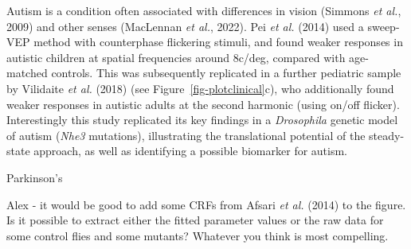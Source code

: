 \documentclass[
  letterpaper,
  DIV=11,
  numbers=noendperiod]{scrartcl}
\begin{document}
Autism is a condition often associated with differences in vision
(Simmons \emph{et al.}, 2009) and other senses (MacLennan \emph{et al.},
2022). Pei \emph{et al.} (2014) used a sweep-VEP method with
counterphase flickering stimuli, and found weaker responses in autistic
children at spatial frequencies around 8c/deg, compared with age-matched
controls. This was subsequently replicated in a further pediatric sample
by Vilidaite \emph{et al.} (2018) (see Figure~\ref{fig-plotclinical}c),
who additionally found weaker responses in autistic adults at the second
harmonic (using on/off flicker). Interestingly this study replicated its
key findings in a \emph{Drosophila} genetic model of autism (\emph{Nhe3}
mutations), illustrating the translational potential of the steady-state
approach, as well as identifying a possible biomarker for autism.

Parkinson's

Alex - it would be good to add some CRFs from Afsari \emph{et al.}
(2014) to the figure. Is it possible to extract either the fitted
parameter values or the raw data for some control flies and some
mutants? Whatever you think is most compelling.
\end{document}
